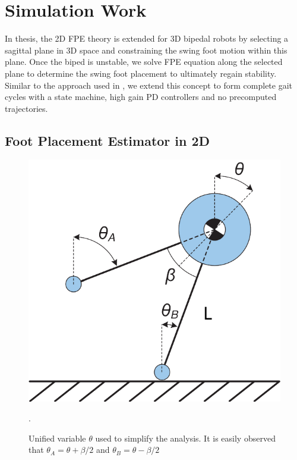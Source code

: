 \chapter{Simulation Work} %
\label{cha:simulations}
In thesis, the 2D FPE theory is extended for 3D bipedal robots by selecting a sagittal plane in 3D space and constraining the swing foot motion within this plane. Once the biped is unstable, we solve FPE equation along the selected plane to determine the swing foot placement to ultimately regain stability. Similar to the approach used in \cite{Wight:2008ii,Wight:2008vt}, we extend this concept to form complete gait cycles with a state machine, high gain PD controllers and no precomputed trajectories.


\section{Foot Placement Estimator in 2D} %
\label{sec:foot_placement_estimator_in_2d}

\begin{figure}[t]
	\centering
    \includegraphics[scale=0.7]{fig/ch4/compass.pdf}
  	\caption{Unified variable $\theta$ used to simplify the analysis. It is easily observed that $\theta_A = \theta  + \beta /2$ and $\theta_B = \theta  - \beta /2$}.
	\label{fig:unified}
\end{figure}

